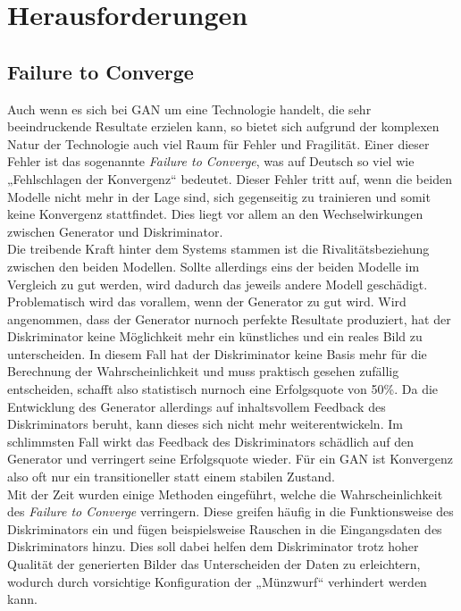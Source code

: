 \chapter{Herausforderungen}

\section{Failure to Converge}
\label{chap:FTC}

\noindent Auch wenn es sich bei \ac{GAN} um eine Technologie handelt, die sehr beeindruckende Resultate erzielen kann, so bietet sich aufgrund der komplexen Natur der Technologie auch viel Raum für Fehler und Fragilität. Einer dieser Fehler ist das sogenannte \textit{Failure to Converge}, was auf Deutsch so viel wie „Fehlschlagen der Konvergenz“ bedeutet. Dieser Fehler tritt auf, wenn die beiden Modelle nicht mehr in der Lage sind, sich gegenseitig zu trainieren und somit keine Konvergenz stattfindet. Dies liegt vor allem an den Wechselwirkungen zwischen Generator und Diskriminator. \\

\noindent Die treibende Kraft hinter dem Systems stammen ist die Rivalitätsbeziehung zwischen den beiden Modellen. Sollte allerdings eins der beiden Modelle im Vergleich zu gut werden, wird dadurch das jeweils andere Modell geschädigt. Problematisch wird das vorallem, wenn der Generator zu gut wird. Wird angenommen, dass der Generator nurnoch perfekte Resultate produziert, hat der Diskriminator keine Möglichkeit mehr ein künstliches und ein reales Bild zu unterscheiden. In diesem Fall hat der Diskriminator keine Basis mehr für die Berechnung der Wahrscheinlichkeit und muss praktisch gesehen zufällig entscheiden, schafft also statistisch nurnoch eine Erfolgsquote von 50\%. Da die Entwicklung des Generator allerdings auf inhaltsvollem Feedback des Diskriminators beruht, kann dieses sich nicht mehr weiterentwickeln. Im schlimmsten Fall wirkt das Feedback des Diskriminators schädlich auf den Generator und verringert seine Erfolgsquote wieder. Für ein \ac{GAN} ist Konvergenz also oft nur ein transitioneller statt einem stabilen Zustand. \\

\noindent Mit der Zeit wurden einige Methoden eingeführt, welche die Wahrscheinlichkeit des \textit{Failure to Converge} verringern. Diese greifen häufig in die Funktionsweise des Diskriminators ein und fügen beispielsweise Rauschen in die Eingangsdaten des Diskriminators hinzu. Dies soll dabei helfen dem Diskriminator trotz hoher Qualität der generierten Bilder das Unterscheiden der Daten zu erleichtern, wodurch durch vorsichtige Konfiguration der „Münzwurf“ verhindert werden kann.\cite{training} \\